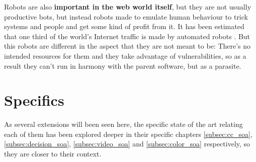 Robots are also \textbf{important in the web world itself}, but they are not usually productive bots, but instead robots made to emulate human behaviour to trick systems and people and get some kind of profit from it. It has been estimated that one third of the world's Internet traffic is made by automated robots \cite{ref:robots_in_the_web}. But this robots are different in the aspect that they are not meant to be: There's no intended resources for them and they take advantage of vulnerabilities, so as a result they can't run in harmony with the parent software, but as a parasite.

\section{Specifics}
As several extensions will been seen here, the specific state of the art relating each of them has been explored deeper in their specific chapters \ref{subsec:cc_soa}, \ref{subsec:decision_soa}, \ref{subsec:video_soa} and \ref{subsec:color_soa} respectively, so they are closer to their context.

